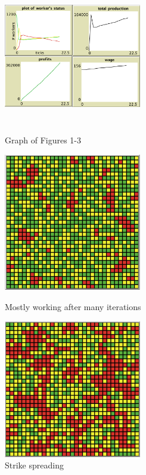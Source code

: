 \documentclass[11pt]{article}
\begin{document}
\begin{figure}[htbp]
	\centering
	\includegraphics[width=6cm, height=6cm]{graph1}
	\caption{Graph of Figures 1-3}
	\centering
	\includegraphics[width=6cm, height=6cm]{start}
	\caption{Mostly working after many iterations}
	\centering
	\includegraphics[width=6cm, height=6cm]{middle}
	\caption{Strike spreading}
\end{figure}
\end{document}
